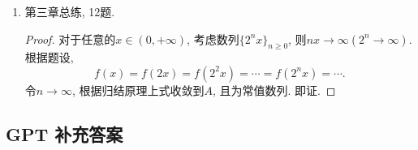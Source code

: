 \documentclass[UTF8,11pt, a4paper, oneside, fontset=none]{ctexbook}
\begin{document}
\begin{enumerate}
\begin{proof}

和定理3.10的证明完全类似.

\end{proof}

\item 第三章总练, 12题.


\begin{proof}


对于任意的$x \in (0, +\infty)$, 考虑数列$\{2^nx \}_{n \geq 0}$, 则$nx \to \infty (2^n \to \infty)$. 根据题设,
\[
f(x) = f(2x) = f(2^2x) =  \cdots = f(2^n x) = \cdots.
\]
令$n \to \infty$, 根据归结原理上式收敛到$A$, 且为常值数列. 即证.

\end{proof}


\end{enumerate}

\clearpage

\subsection*{GPT 补充答案}
\end{document}
